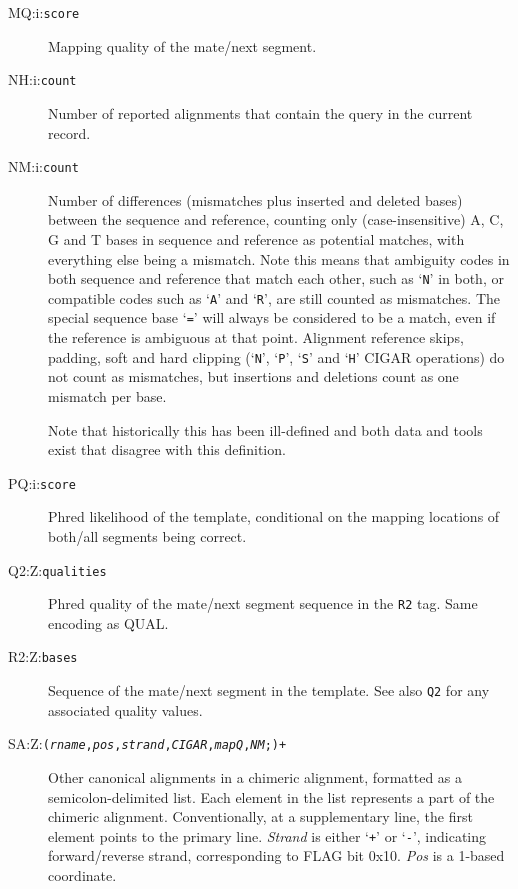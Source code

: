 \documentclass[10pt]{article}
\newcommand{\tagvalue}[1]{{\tt #1}}
\newcommand{\tagregex}[1]{{\tt #1}}
\begin{document}
\begin{description}
\item[MQ:i:\tagvalue{score}]
Mapping quality of the mate/next segment.

\item[NH:i:\tagvalue{count}]
Number of reported alignments that contain the query in the current record.

\item[NM:i:\tagvalue{count}]
Number of differences (mismatches plus inserted and deleted bases) between the sequence and reference, counting only (case-insensitive) A, C, G and T bases in sequence and reference as potential matches, with everything else being a mismatch.
Note this means that ambiguity codes in both sequence and reference that match each other, such as `{\tt N}' in both, or compatible codes such as `{\tt A}' and `{\tt R}', are still counted as mismatches.
The special sequence base `{\tt =}' will always be considered to be a match, even if the reference is ambiguous at that point.
Alignment reference skips, padding, soft and hard clipping (`{\tt N}', `{\tt P}', `{\tt S}' and `{\tt H}' {\sf CIGAR} operations) do not count as mismatches, but insertions and deletions count as one mismatch per base.

Note that historically this has been ill-defined and both data and tools exist that disagree with this definition.

\item[PQ:i:\tagvalue{score}]
Phred likelihood of the template, conditional on the mapping locations of both/all segments being correct.

\item[Q2:Z:\tagvalue{qualities}]
Phred quality of the mate/next segment sequence in the {\tt R2} tag.
Same encoding as {\sf QUAL}.

\item[R2:Z:\tagvalue{bases}]
Sequence of the mate/next segment in the template.  See also {\tt Q2}
for any associated quality values.

\item[SA:Z:\tagregex{{\tt (}\emph{rname}{\tt ,}\emph{pos}{\tt ,}\emph{strand}{\tt ,}\emph{CIGAR}{\tt ,}\emph{mapQ}{\tt ,}\emph{NM}{\tt ;)}+}]
Other canonical alignments in a chimeric alignment, formatted as a semicolon-delimited list.
Each element in the list represents a part of the chimeric alignment. Conventionally, at a supplementary line, the first element points to the primary line.
\emph{Strand} is either `{\tt +}' or `{\tt -}', indicating forward/reverse strand, corresponding to FLAG bit 0x10.
\emph{Pos} is a 1-based coordinate.


\end{description}
\end{document}
